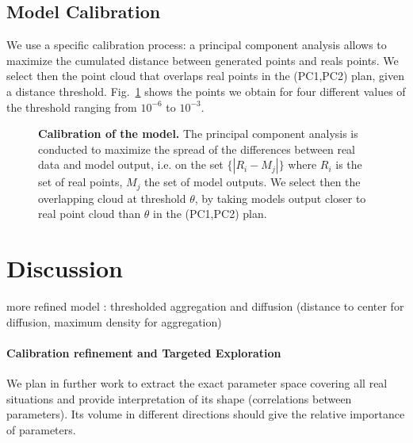 \documentclass[10pt,letterpaper,draft]{article}
\begin{document}
\subsection*{Model Calibration}



We use a specific calibration process: a principal component analysis allows to maximize the cumulated distance between generated points and reals points. We select then the point cloud that overlaps real points in the (PC1,PC2) plan, given a distance threshold. Fig.~\ref{fig:densitycalib} shows the points we obtain for four different values of the threshold ranging from $10^{-6}$ to $10^{-3}$.




\begin{figure}
\caption[Precise calibration of the model]{\textbf{Calibration of the model.} The principal component analysis is conducted to maximize the spread of the differences between real data and model output, i.e. on the set $\{\left|R_i - M_j\right|\}$ where $R_i$ is the set of real points, $M_j$ the set of model outputs. We select then the overlapping cloud at threshold $\theta$, by taking models output closer to real point cloud than $\theta$ in the (PC1,PC2) plan.}
\label{fig:densitycalib}
\end{figure}







\section*{Discussion}


more refined model : thresholded aggregation and diffusion (distance to center for diffusion, maximum density for aggregation)

\paragraph{Calibration refinement and Targeted Exploration}

We plan in further work to extract the exact parameter space covering all real situations and provide interpretation of its shape (correlations between parameters). Its volume in different directions should give the relative importance of parameters.
\end{document}
